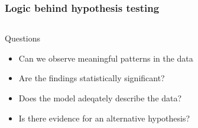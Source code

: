 \documentclass[10pt, compress]{beamer}
\begin{document}
\begin{frame}
    \frametitle{Logic behind hypothesis testing}
    \begin{columns}
        \begin{block}{Questions}
            \begin{itemize}
                \item Can we observe meaningful patterns in the data
                \item Are the findings statistically significant?
                \item Does the model adeqately describe the data?
                \item Is there evidence for an alternative hypothesis?
            \end{itemize}
        \end{block}
        \begin{block}{}
            \begin{figure}
                \scalebox{0.7}
                {
                }
            \end{figure}
        \end{block}
    \end{columns}
\end{frame}
\end{document}
